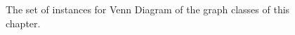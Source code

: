 \begin{figure}[htb]
\begin{tabular}{  c c c c  c}
  \end{tabular}
 \caption{The set of instances for Venn Diagram of the graph classes of this chapter.}
 \label{fig:exemplosDiagram}
\end{figure}  
 



















 
    

